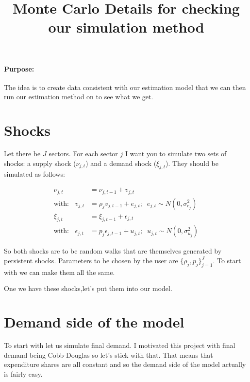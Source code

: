 \documentclass[12pt,english]{article}
\begin{document}


\title{Monte Carlo Details for checking our simulation method}
\maketitle

\paragraph{Purpose:} The idea is to create data consistent with our estimation model that we can then run our estimation method on to see what we get.

\section{Shocks}

Let there be $J$ sectors. For each sector $j$ I want you to simulate two sets of shocks: a supply shock ($\nu_{j,t}$) and a demand shock ($\xi_{j,t}$). They should be simulated as follows:

\begin{align*}
	\nu_{j,t} &= \nu_{j,t-1} + v_{j,t}\\
	\text{with: }\;\; v_{j,t}&=\rho_j v_{j,t-1}+e_{j,t};\;\;e_{j,t}\sim N(0,\sigma_{e_j}^2)\\
	\xi_{j,t}&= \xi_{j,t-1} + \epsilon_{j,t}\\
	\text{with: }\;\;\epsilon_{j,t}&=p_j \epsilon_{j,t-1}+u_{j,t};\;\;u_{j,t}\sim N(0,\sigma_{u_j}^2)
\end{align*}

So both shocks are to be random walks that are themselves generated by persistent shocks. Parameters to be chosen by the user are $\{\rho_j,p_j\}_{j=1}^J$. To start with we can make them all the same.

One we have these shocks,let's put them into our model.

\section{Demand side of the model}

To start with let us simulate final demand. I motivated this project with final demand being Cobb-Douglas so let's stick with that. That means that expenditure shares are all constant and so the demand side of the model actually is fairly easy.
\end{document}
